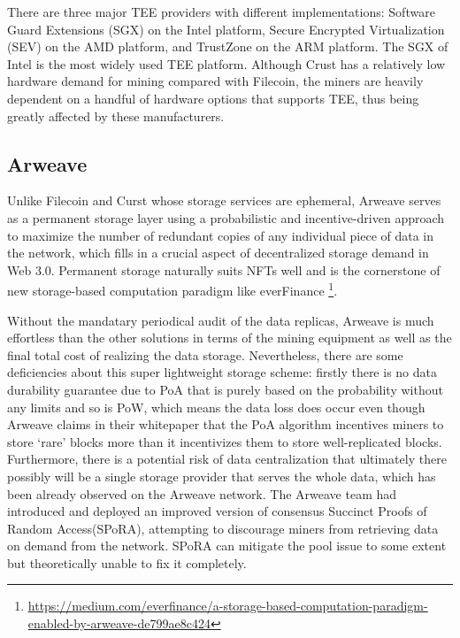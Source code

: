 \documentclass[]{article}
\begin{document}
There are three major TEE providers with different implementations: Software Guard Extensions (SGX) on the Intel platform, Secure Encrypted Virtualization (SEV) on the AMD platform, and TrustZone on the ARM platform. The SGX of Intel is the most widely used TEE platform. Although Crust has a relatively low hardware demand for mining compared with Filecoin, the miners are heavily dependent on a handful of hardware options that supports TEE, thus being greatly affected by these manufacturers.



\subsection{Arweave}

Unlike Filecoin and Curst whose storage services are ephemeral, Arweave\cite{arweave} serves as a permanent storage layer using a probabilistic and incentive-driven approach to maximize the number of redundant copies of any individual piece of data in the network, which fills in a crucial aspect of decentralized storage demand in Web 3.0. Permanent storage naturally suits NFTs well and is the cornerstone of new storage-based computation paradigm like everFinance \footnote{\url{https://medium.com/everfinance/a-storage-based-computation-paradigm-enabled-by-arweave-de799ae8c424}}.

Without the mandatary periodical audit of the data replicas, Arweave is much effortless than the other solutions in terms of the mining equipment as well as the final total cost of realizing the data storage. Nevertheless, there are some deficiencies about this super lightweight storage scheme: firstly there is no data durability guarantee due to PoA that is purely based on the probability without any limits and so is PoW, which means the data loss does occur even though Arweave claims in their whitepaper that the PoA algorithm incentives miners to store ‘rare’ blocks more than it incentivizes them to store well-replicated blocks. Furthermore, there is a potential risk of data centralization that ultimately there possibly will be a single storage provider that serves the whole data, which has been already observed on the Arweave network. The Arweave team had introduced and deployed an improved version of consensus Succinct Proofs of Random Access(SPoRA), attempting to discourage miners from retrieving data on demand from the network. SPoRA can mitigate the pool issue to some extent but theoretically unable to fix it completely.
\end{document}

